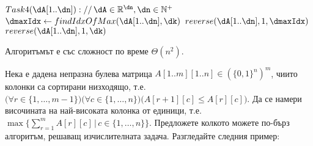 \begin{solution}
\begin{pseudocode}
		$Task4(\dA[1..\dn])://\,\dA\in\mathbb{R}^{\dn},\dn\in\mathbb{N}^+$
		\Mybegin
		{	
			{
				$\dmaxIdx\leftarrow findIdxOfMax(\dA[1..\dn],\dk)$\;
				$reverse(\dA[1..\dn],1,\dmaxIdx)$\;
				$reverse(\dA[1..\dn],1,\dk)$\;
			}
			\KwRet{$\dA[1..\dn]$\;}
		}
	\end{pseudocode}
	Алгоритъмът е със сложност по време $\Theta(n^2)$.
\end{solution}\leavevmode\newline

\begin{problem}
	Нека е дадена непразна булева матрица $A[1..m][1..n]\in(\{0,1\}^n)^m$, чиито колонки са сортирани низходящо, т.е. $\big(\forall r\in\{1,\dots,m-1\}\big)\big(\forall c\in\{1,\dots,n\}\big)\big(A[r+1][c]\le A[r][c]\big)$. Да се намери височината на най-високата колонка от единици, т.е. $\max\{\sum_{r=1}^m\!A[r][c]\,|\,c\in\{1,\dots,n\}\}$. Предложете колкото можете по-бърз алгоритъм, решаващ изчислителната задача. Разгледайте следния пример:
\end{problem}
